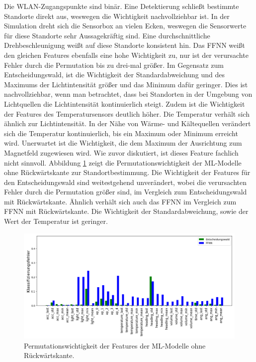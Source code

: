 Die WLAN-Zugangspunkte sind binär.
Eine Detektierung schließt bestimmte Standorte direkt aus, weswegen die Wichtigkeit nachvollziehbar ist.
In der Simulation dreht sich die Sensorbox an vielen Ecken, weswegen die Sensorwerte für diese Standorte sehr Aussagekräftig sind.
Eine durchschnittliche Drehbeschleunigung weißt auf diese Standorte konsistent hin.
\newline
\newline
Das FFNN weißt den gleichen Features ebenfalls eine hohe Wichtigkeit zu, nur ist der verursachte Fehler durch die Permutation bis zu drei-mal größer.
Im Gegensatz zum Entscheidungswald, ist die Wichtigkeit der Standardabweichung und des Maximums der Lichtintensität größer und das Minimum dafür geringer.
Dies ist nachvollziehbar, wenn man betrachtet, dass bei Standorten in der Umgebung von Lichtquellen die Lichtintensität kontinuierlich steigt.
Zudem ist die Wichtigkeit der Features des Temperatursensors deutlich höher.
Die Temperatur verhält sich ähnlich zur Lichtintensität.
In der Nähe von Wärme- und Kältequellen verändert sich die Temperatur kontinuierlich, bis ein Maximum oder Minimum erreicht wird.
Unerwartet ist die Wichtigkeit, die dem Maximum der Ausrichtung zum Magnetfeld zugewiesen wird.
Wie zuvor diskutiert, ist dieses Feature fachlich nicht sinnvoll.
\newline
\newline
Abbildung \ref{fig:fi_consolidated_wo_fb} zeigt die Permutationswichtigkeit der ML-Modelle ohne Rückwärtskante zur Standortbestimmung.
Die Wichtigkeit der Features für den Entscheidungswald sind weitestgehend unverändert,
wobei die verursachten Fehler durch die Permutation größer sind, im Vergleich zum Entscheidungswald mit Rückwärtskante.
Ähnlich verhält sich auch das FFNN im Vergleich zum FFNN mit Rückwärtskante.
Die Wichtigkeit der Standardabweichung, sowie der Wert der Temperatur ist geringer.
\begin{figure}[h!]
    \centering
    \includegraphics[width=\linewidth]{images/fi_consolidated_wo_fb.png}
    \caption{Permutationswichtigkeit der Features der ML-Modelle ohne\\ Rückwärtskante.}
    \label{fig:fi_consolidated_wo_fb}
\end{figure}
